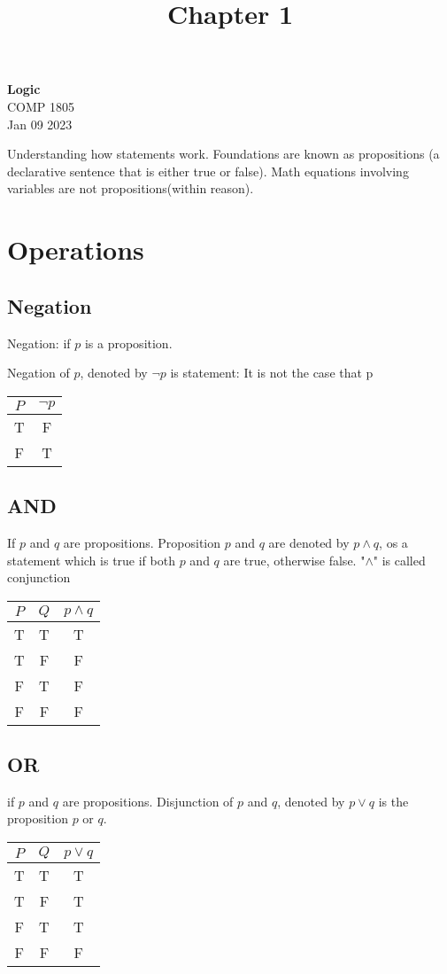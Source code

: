 \documentclass[11pt]{article}
\theoremstyle{definition}
\newcommand\chaptercounter{1}
\begin{document}
\title{Chapter \chaptercounter}
\thispagestyle{empty}

\begin{center}
{\LARGE \bf Logic}\\
{\large COMP 1805}\\
Jan 09 2023
\end{center}

Understanding how statements work. Foundations are known as propositions (a declarative sentence that is either true or false). Math equations involving variables are not propositions(within reason).

\section{Operations}
\subsection{Negation}
Negation: if $p$ is a proposition.

Negation of $p$, denoted by $\neg p $ is statement: It is not the case that p
\begin{center}
	\begin{tabular}{ |c|c| } 
 		\hline
 		$P$ & $\neg p$ \\
		\hline
 		T & F \\
 		F & T \\
 		\hline
	\end{tabular}
\end{center}
\subsection{AND}
If $p$ and $q$ are propositions. Proposition $p$ and $q$ are denoted by $p \land q$, os a statement which is true if both $p$ and $q$ are true, otherwise false. "$\land$" is called conjunction
\begin{center}
	\begin{tabular}{ |c|c|c| } 
 		\hline
 		$P$ & $Q$ & $p \land q$\\
		\hline
 		T & T  & T\\
 		T & F & F\\
		F & T & F\\
		F & F & F \\
 		\hline
	\end{tabular}
\end{center}
\subsection{OR}
if $p$ and $q$ are propositions. Disjunction of $p$ and $q$, denoted by $p \lor q$ is the proposition $p$ or $q$.
\begin{center}
	\begin{tabular}{ |c|c|c| } 
 		\hline
 		$P$ & $Q$ & $p \lor q$\\
		\hline
 		T & T  & T\\
 		T & F & T\\
		F & T & T\\
		F & F & F \\
 		\hline
	\end{tabular}
\end{center}
\end{document}
